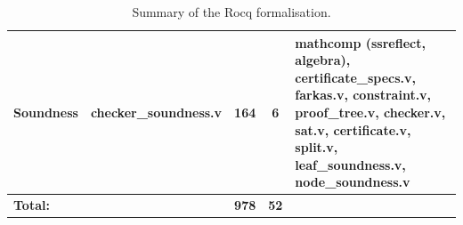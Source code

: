 \begin{table}[ht]
\begin{tabularx}{\textwidth}{
    @{}
    p{}
    p{}
    c
    c
    X
    @{}}
Soundness
&
checker\_soundness.v
&
164
&
6
&
mathcomp (ssreflect, algebra),
certificate\_specs.v, farkas.v,
constraint.v, proof\_tree.v,
checker.v, sat.v, certificate.v,
split.v, leaf\_soundness.v,
node\_soundness.v
\\
\midrule

\textbf{Total:}
&
&
\textbf{978}
&
\textbf{52}
&
\\

\bottomrule
\end{tabularx}
\caption{Summary of the Rocq formalisation.}
\label{tab:rocq-formal-results}
\end{table}
